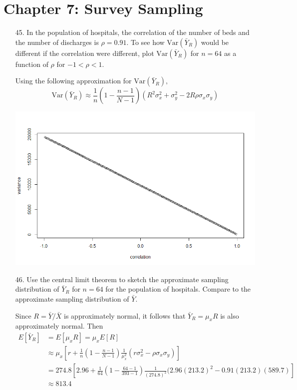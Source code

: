 \documentclass{article}
\newcommand{\var}{\mathrm{Var}}
\begin{document}
\section*{Chapter 7: Survey Sampling}
\begin{itemize}
	\item[45.] In the population of hospitals, the correlation of the number of beds and the number of discharges is $\rho=0.91.$ To see how $\var(\bar{Y}_R)$ would be different if the correlation were different, plot $\var(\bar{Y}_R)$ for $n=64$ as a function of $\rho$ for $-1<\rho<1.$
		\begin{answer*}
			Using the following approximation for $\var(\bar{Y}_R),$ \[\var(\bar{Y}_R)\approx \frac{1}{n}\left( 1-\frac{n-1}{N-1} \right)(R^2\sigma_x^2 + \sigma_y^2 - 2R\rho\sigma_x\sigma_y)\]
			\begin{center}
				\includegraphics[width=14cm]{var_ratio_rho.png}
			\end{center}
		\end{answer*}
		

	\item[46.] Use the central limit theorem to sketch the approximate sampling distribution of $\bar{Y}_R$ for $n=64$ for the population of hospitals. Compare to the approximate sampling distribution of $\bar{Y}.$
		\begin{soln}
			Since $R=\bar{Y}/\bar{X}$ is approximately normal, it follows that $\bar{Y}_R=\mu_x R$ is also approximately normal. Then 
			\begin{align*}
				E[\bar{Y}_R] &= E[\mu_x R] = \mu_x E[R] \\
				&\approx \mu_x \left[ r+\frac{1}{n}\left( 1-\frac{n-1}{N-1} \right)\frac{1}{\mu_x^2}(r\sigma_x^2-\rho\sigma_x\sigma_y) \right] \\
				&= 274.8 \left[ 2.96 + \frac{1}{64}\left( 1-\frac{64-1}{393-1} \right)\frac{1}{(274.8)^2}(2.96(213.2)^2-0.91(213.2)(589.7) \right] \\
				&\approx 813.4
			\end{align*}


\end{soln}
\end{itemize}
\end{document}
